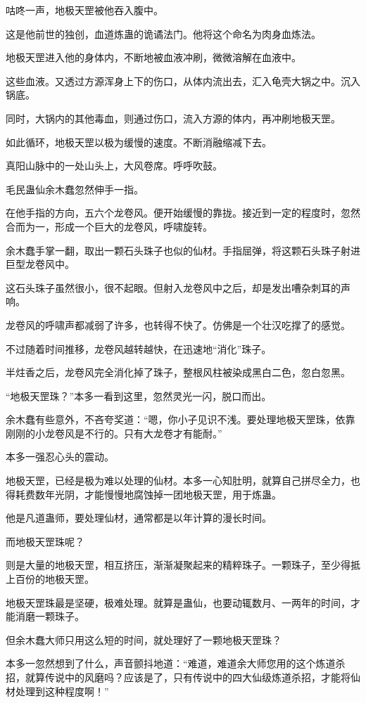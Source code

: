 \begin{this_body}
咕咚一声，地极天罡被他吞入腹中。

这是他前世的独创，血道炼蛊的诡谲法门。他将这个命名为肉身血炼法。

地极天罡进入他的身体内，不断地被血液冲刷，微微溶解在血液中。

这些血液。又透过方源浑身上下的伤口，从体内流出去，汇入龟壳大锅之中。沉入锅底。

同时，大锅内的其他毒血，则通过伤口，流入方源的体内，再冲刷地极天罡。

如此循环，地极天罡以极为缓慢的速度。不断消融缩减下去。

真阳山脉中的一处山头上，大风卷席。呼呼吹鼓。

毛民蛊仙余木蠢忽然伸手一指。

在他手指的方向，五六个龙卷风。便开始缓慢的靠拢。接近到一定的程度时，忽然合而为一，形成一个巨大的龙卷风，呼啸旋转。

余木蠢手掌一翻，取出一颗石头珠子也似的仙材。手指屈弹，将这颗石头珠子射进巨型龙卷风中。

这石头珠子虽然很小，很不起眼。但射入龙卷风中之后，却是发出嘈杂刺耳的声响。

龙卷风的呼啸声都减弱了许多，也转得不快了。仿佛是一个壮汉吃撑了的感觉。

不过随着时间推移，龙卷风越转越快，在迅速地“消化”珠子。

半炷香之后，龙卷风完全消化掉了珠子，整根风柱被染成黑白二色，忽白忽黑。

“地极天罡珠？”本多一看到这里，忽然灵光一闪，脱口而出。

余木蠢有些意外，不吝夸奖道：“嗯，你小子见识不浅。要处理地极天罡珠，依靠刚刚的小龙卷风是不行的。只有大龙卷才有能耐。”

本多一强忍心头的震动。

地极天罡，已经是极为难以处理的仙材。本多一心知肚明，就算自己拼尽全力，也得耗费数年光阴，才能慢慢地腐蚀掉一团地极天罡，用于炼蛊。

他是凡道蛊师，要处理仙材，通常都是以年计算的漫长时间。

而地极天罡珠呢？

则是大量的地极天罡，相互挤压，渐渐凝聚起来的精粹珠子。一颗珠子，至少得抵上百份的地极天罡。

地极天罡珠最是坚硬，极难处理。就算是蛊仙，也要动辄数月、一两年的时间，才能消磨一颗珠子。

但余木蠢大师只用这么短的时间，就处理好了一颗地极天罡珠？

本多一忽然想到了什么，声音颤抖地道：“难道，难道余大师您用的这个炼道杀招，就算传说中的风磨吗？应该是了，只有传说中的四大仙级炼道杀招，才能将仙材处理到这种程度啊！”


\end{this_body}
